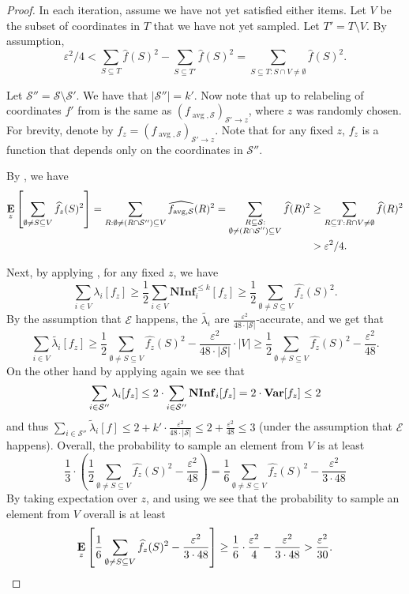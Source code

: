 \documentclass[10pt,a4paper]{article}
\theoremstyle{plain}
\theoremstyle{remark}
\theoremstyle{plain}
\providecommand{\E}{}
\renewcommand{\E}{\mathop{\bf E\/}}
\newcommand{\Var}{\mathop{\bf Var\/}}
\newcommand\NormInf{{\mathbf{NInf}}}
\newcommand{\eps}{\varepsilon}
\renewcommand{\hat}{\widehat}
\renewcommand{\tilde}{\widetilde}
\newcommand{\calE}{\mathcal{E}}
\newcommand{\calS}{\mathcal{S}}
\newcommand{\avg}{\operatorname{avg}}
\newcommand{\InfluentialCoords}{\calS}
\renewcommand{\epsilon}{\varepsilon}
\begin{document}
\begin{proof}
In each iteration, assume we have not yet satisfied either items. Let $V$ be the subset of coordinates in $T$ that we have  not yet sampled.
Let $T' = T \setminus V$. By assumption, $$\epsilon^2/4<\sum_{S\subseteq T} \hat{f}(S)^2- \sum_{S\subseteq T'} \hat{f}(S)^2 =  \sum_{S\subseteq T : S \cap V \neq \emptyset} \hat{f}(S)^2.$$

Let $\InfluentialCoords'' = \InfluentialCoords\setminus \InfluentialCoords'$. We have that $|\InfluentialCoords''| = k'$.
Now note that up to relabeling of coordinates 
$f'$ from  is the same as $(f_{\avg, \InfluentialCoords})_{\InfluentialCoords' \to z}$,
where $z$ was randomly chosen.
For brevity, denote by $f_z = (f_{\avg, \InfluentialCoords})_{\InfluentialCoords' \to z}$. Note that for any fixed $z$, $f_z$ is a function that depends only on the coordinates in $\InfluentialCoords''$.


By , we have 
\begin{align}
\E_z\left[ \sum_{\emptyset \neq S \subseteq V}\hat{f_z}(S)^2\right] 
= \sum_{R:  \emptyset \neq (R\cap \InfluentialCoords'') \subseteq V}\hat{f_{\avg, \InfluentialCoords}}(R)^2 =
\sum_{\substack{R\subseteq \InfluentialCoords : \\ \emptyset \neq (R\cap \InfluentialCoords'') \subseteq V}}\hat{f}(R)^2 
&\ge 
\sum_{R\subseteq T : R \cap V \neq \emptyset} \hat{f}(R)^2 \nonumber\\&> \eps^2/4.\label{eq:fz}
\end{align}

Next, by applying , for any fixed $z$, we have
$$
\sum_{i\in V} \lambda_i[f_z]\ge \frac{1}{2} \sum_{i\in V} \NormInf_i^{\le k}[f_z]\ge \frac{1}{2} \sum_{\emptyset \neq S \subseteq V} \hat{f_z}(S)^2.
$$
By the assumption that  $\calE$ happens, the $\tilde{\lambda_i}$ are $\frac{\eps^2}{48\cdot |\InfluentialCoords|}$-accurate, and we get that 
$$
\sum_{i \in V} \tilde{\lambda_i}[f_z] \ge \frac{1}{2} \sum_{\emptyset \neq S \subseteq V}\hat{f_z}(S)^2 - \frac{\eps^2}{48\cdot |\InfluentialCoords|} \cdot |V|
\ge \frac{1}{2} \sum_{\emptyset \neq S \subseteq V}\hat{f_z}(S)^2 - \frac{\eps^2}{48}.
$$
On the other hand by applying  again we see that $$\sum_{i\in \InfluentialCoords''} \lambda_i[f_z] \le 2\cdot \sum_{i\in \InfluentialCoords''} \NormInf_i[f_z]= 2\cdot \Var[f_z]\le 2$$ 
and thus 
$\sum_{i\in \InfluentialCoords''} \tilde{\lambda}_i[f]  \le 2 + k'\cdot \frac{\eps^2}{48\cdot |\InfluentialCoords|} \le 2 + \frac{\eps^2}{48} \le 3$ (under the assumption that $\calE$ happens).
Overall, the probability to sample an element from $V$ is at least 
$$
\frac{1}{3} \cdot \left(\frac{1}{2} \sum_{\emptyset \neq S \subseteq V}\hat{f_z}(S)^2 - \frac{\eps^2}{48}\right) 
= \frac{1}{6} \sum_{\emptyset \neq S \subseteq V}\hat{f_z}(S)^2 - \frac{\eps^2}{3\cdot 48}
$$
By taking  expectation over $z$, and using  we see that the probability to sample an element from $V$ overall is at least 
$$
\E_{z}\left[\frac{1}{6} \sum_{\emptyset \neq S \subseteq V}\hat{f_z}(S)^2 - \frac{\eps^2}{3\cdot 48}\right] 
\ge  \frac{1}{6} \cdot \frac{\eps^2}{4} - \frac{\eps^2}{3\cdot 48} > \frac{\eps^2}{30}.
$$


\end{proof}
\end{document}

